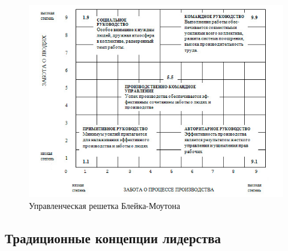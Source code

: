 \documentclass[a4paper,12pt,oneside,final]{extarticle}
\makeatletter
\numberwithin{equation}{section}
\def\maxwidth#1{\ifdim\Gin@nat@width>#1 #1\else\Gin@nat@width\fi}
\makeatother
\begin{document}
\begin{figure}[h]
	\centering
	\includegraphics[width=\maxwidth{\textwidth}]{management-figures/leadership_lattice}
	\caption{Управленческая решетка Блейка-Моутона}
	\label{leadership_lattice}
\end{figure}

\subsection{Традиционные концепции лидерства}
\end{document}

